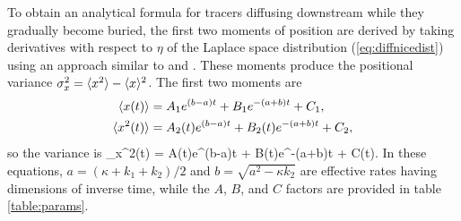 To obtain an analytical formula for tracers diffusing downstream while they gradually become buried, the first two moments of position are derived by taking derivatives with respect to $\eta$ of the Laplace space distribution (\ref{eq:diffnicedist}) using an approach similar to \citet{Shlesinger1974} and \citet{Weeks1998}. These moments produce the positional variance $\sigma_x^2 = \langle x^2\rangle - \langle x \rangle^2$. 
The first two moments are
\begin{align}
	\langle x(t) \rangle &= A_1 e^{(b-a)t}+B_1e^{-(a+b)t}+C_1, \label{eq:mean}\\
	\langle x^2(t) \rangle &= A_2(t)e^{(b-a)t}+B_2(t)e^{-(a+b)t}+C_2, \label{eq:second}
\end{align}
so the variance is 
\be \sigma_x^2(t) = A(t)e^{(b-a)t} + B(t)e^{-(a+b)t} + C(t). \label{eq:var}\ee
In these equations, $a = (\kappa + k_1+k_2)/2$ and $b = \sqrt{a^2-\kappa k_2}$ are effective rates having dimensions of inverse time, while the $A$, $B$, and $C$ factors are provided in table \ref{table:params}.

